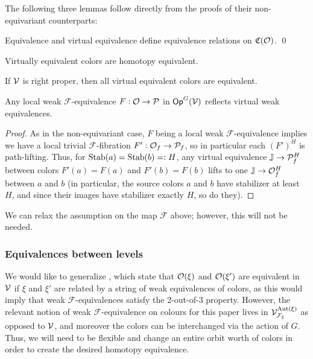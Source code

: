 \documentclass[a4paper,10pt
,draft
]{article}%
\renewcommand{\F}{\mathcal F}
\newcommand{\J}{\mathbb J}
\renewcommand{\1}{\ensuremath{\mathbb{id}}}
\begin{document}
The following three lemmas follow directly from the proofs of their non-equivariant counterparts:
\begin{lemma}
      Equivalence and virtual equivalence define equivalence relations on $\mathfrak C(\mathcal{O})$. \qed
\end{lemma}
\begin{lemma}
      Virtually equivalent colors are homotopy equivalent. 
\end{lemma}
\begin{lemma}
      \label{RIGHTPROPER_LEM}
      If $\mathcal V$ is right proper, then all virtual equivalent colors are equivalent. 
\end{lemma}

\begin{lemma}
      Any local weak $\F$-equivalence $F: \mathcal{O}\to \mathcal{P}$ in $\mathsf{Op}^G(\mathcal V)$ reflects virtual weak equivalences.
\end{lemma}
\begin{proof}
      As in the non-equivariant case, $F$ being a local weak $\F$-equivalence implies
      we have a local trivial $\F$-fibration $F': \mathcal{O}_f\to \mathcal{P}_f$,
      so in particular each $(F')^H$ is path-lifting.
      Thus, for $\mathrm{Stab}(a) = \mathrm{Stab}(b) =: H$, any virtual equivalence $\J \to \P_f^H$ between colors
      $F'(a) = F(a)$ and $F'(b) = F(b)$
      lifts to one $\J \to \O_f^H$ between $a$ and $b$
      (in particular,
      the source colors $a$ and $b$ have stabilizer at least $H$, and since their images have stabilizer exactly $H$, so do they). 
\end{proof}

\begin{remark}
      We can relax the assumption on the map $\F$ above; however, this will not be needed.
\end{remark}

\subsubsection{Equivalences between levels}

We would like to generalize \cite[4.14 and 4.15]{Cav14}, which state that
$\mathcal{O}(\xi)$ and $\mathcal{O}(\xi')$ are equivalent in $\mathcal V$ if $\xi$ and $\xi'$ are related by a string of weak equivalences of colors,
as this would imply that weak $\F$-equivalences satisfy the 2-out-of-3 property.
However, the relevant notion of weak $\F$-equivalence on colours for this paper lives in $\V^{\Aut(\xi)}_{\F_\xi}$ as opposed to $\mathcal V$,
and moreover the colors can be interchanged via the action of $G$.
Thus, we will need to be flexible and change an entire orbit worth of colors in order to create the desired homotopy equivalence. 
\end{document}
